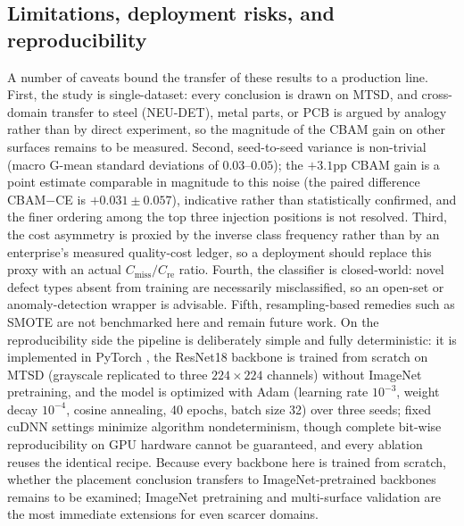 \documentclass[a4paper,fleqn]{cas-sc}
\begin{document}
\begin{sloppypar}
	\subsection{Limitations, deployment risks, and reproducibility}
	\par{
		A number of caveats bound the transfer of these results to a production line. First, the study is single-dataset: every conclusion is drawn on MTSD, and cross-domain transfer to steel (NEU-DET), metal parts, or PCB is argued by analogy rather than by direct experiment, so the magnitude of the CBAM gain on other surfaces remains to be measured. Second, seed-to-seed variance is non-trivial (macro G-mean standard deviations of $0.03$--$0.05$); the $+3.1$pp CBAM gain is a point estimate comparable in magnitude to this noise (the paired difference CBAM$-$CE is $+0.031\pm0.057$), indicative rather than statistically confirmed, and the finer ordering among the top three injection positions is not resolved. Third, the cost asymmetry is proxied by the inverse class frequency rather than by an enterprise's measured quality-cost ledger, so a deployment should replace this proxy with an actual $C_{\text{miss}}/C_{\text{re}}$ ratio. Fourth, the classifier is closed-world: novel defect types absent from training are necessarily misclassified, so an open-set or anomaly-detection wrapper \citep{bergmann2019mvtec,roth2022towards} is advisable. Fifth, resampling-based remedies such as SMOTE \citep{chawla2002smote} are not benchmarked here and remain future work. On the reproducibility side the pipeline is deliberately simple and fully deterministic: it is implemented in PyTorch \citep{paszke2019pytorch}, the ResNet18 backbone is trained from scratch on MTSD (grayscale replicated to three $224\times224$ channels) without ImageNet pretraining, and the model is optimized with Adam \citep{kingma2015adam} (learning rate $10^{-3}$, weight decay $10^{-4}$, cosine annealing, 40 epochs, batch size 32) over three seeds; fixed cuDNN settings minimize algorithm nondeterminism, though complete bit-wise reproducibility on GPU hardware cannot be guaranteed, and every ablation reuses the identical recipe. Because every backbone here is trained from scratch, whether the placement conclusion transfers to ImageNet-pretrained backbones remains to be examined; ImageNet pretraining \citep{krizhevsky2012imagenet} and multi-surface validation are the most immediate extensions for even scarcer domains.
	}

	\clearpage

\end{sloppypar}
\end{document}
